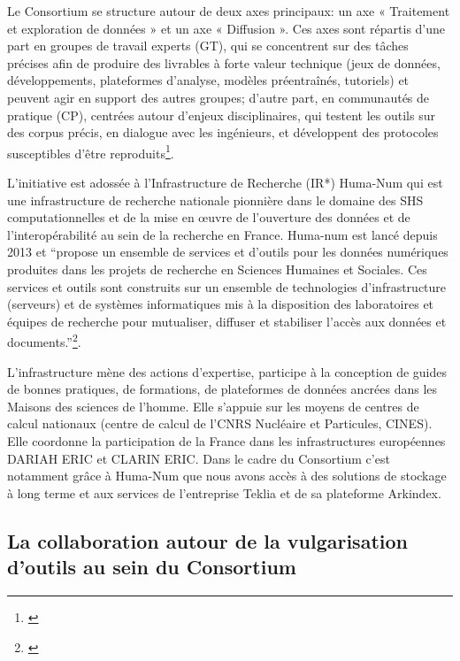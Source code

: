 Le Consortium se structure autour de deux axes principaux: un axe « Traitement et exploration de données » et un axe « Diffusion ». Ces axes sont répartis d’une part en groupes de travail experts (GT), qui se concentrent sur des tâches précises afin de produire des livrables à forte valeur technique (jeux de données, développements, plateformes d’analyse, modèles préentraînés, tutoriels) et peuvent agir en support des autres groupes; d’autre part, en communautés de pratique (CP), centrées autour d’enjeux disciplinaires, qui testent les outils sur des corpus précis, en dialogue avec les ingénieurs, et développent des protocoles susceptibles d’être reproduits\footnote{\cite{noauthor_groupes_nodate}}. \hfill \break

L'initiative est adossée à l'Infrastructure de Recherche (IR*) Huma-Num qui est une infrastructure de recherche nationale pionnière dans le domaine des SHS computationnelles et de la mise en œuvre de l'ouverture des données et de l'interopérabilité au sein de la recherche en France. Huma-num est lancé depuis 2013 et \enquote{propose un ensemble de services et d'outils pour les données numériques produites dans les projets de recherche en Sciences Humaines et Sociales. Ces services et outils sont construits sur un ensemble de technologies d’infrastructure (serveurs) et de systèmes informatiques mis à la disposition des laboratoires et équipes de recherche pour mutualiser, diffuser et stabiliser l’accès aux données et documents.}\footnote{\cite{noauthor_presentation_nodate}}. 

L'infrastructure mène des actions d’expertise, participe à la conception de guides de bonnes pratiques, de formations, de plateformes de données ancrées dans les Maisons des sciences de l’homme. Elle s’appuie sur les moyens de centres de calcul nationaux (centre de calcul de l’CNRS Nucléaire et Particules, CINES). Elle coordonne la participation de la France dans les infrastructures européennes DARIAH ERIC et CLARIN ERIC. Dans le cadre du Consortium c'est notamment grâce à Huma-Num que nous avons accès à des solutions de stockage à long terme et aux services de l'entreprise Teklia et de sa plateforme Arkindex.

\subsection{La collaboration autour de la vulgarisation d'outils au sein du Consortium}

